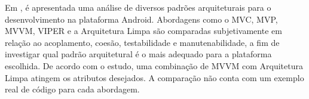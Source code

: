 Em \cite{akhtar}, é apresentada uma análise de diversos padrões arquiteturais para o desenvolvimento na plataforma Android.
Abordagens como o MVC, MVP, MVVM, VIPER e a Arquitetura Limpa são comparadas subjetivamente em relação ao acoplamento, coesão, testabilidade e manutenabilidade, a fim de investigar qual padrão arquitetural é o mais adequado para a plataforma escolhida.
De acordo com o estudo, uma combinação de MVVM com Arquitetura Limpa atingem os atributos desejados.
A comparação não conta com um exemplo real de código para cada abordagem.